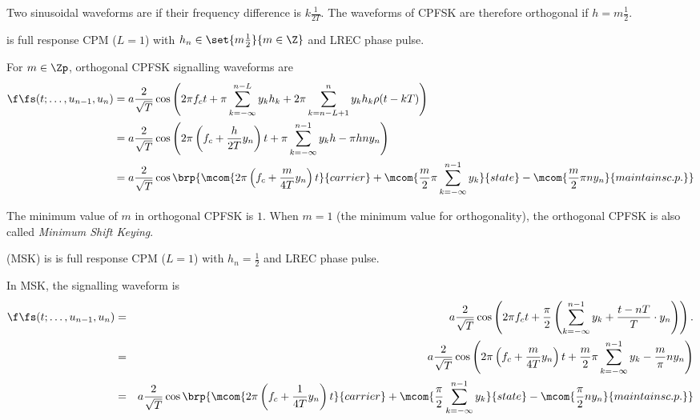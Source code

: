 Two sinusoidal waveforms are  if their frequency difference is 
$k\frac{1}{2T}$. 
The waveforms of CPFSK are therefore orthogonal if $h=m\frac{1}{2}$.
\begin{definition}
is full response CPM ($L=1$) with $h_n\in\set{m\frac{1}{2}}{m\in\Z}$
and LREC phase pulse.
\end{definition}

For $m\in\Zp$, orthogonal CPFSK signalling waveforms are
\begin{align*}
   \f\fs(t;\ldots,u_{n-1},u_n)
     &= a \frac{2}{\sqrt{T}} 
          \cos\left(
             2\pi f_ct + 
             \pi \sum_{k=-\infty}^{n-L} y_k h_k  + 
             2\pi \sum_{k=n-L+1}^n y_k h_k \rho(t-kT)
          \right)
   \\&= a \frac{2}{\sqrt{T}} 
          \cos\left(
             2\pi \left(f_c +  \frac{h}{2T}y_n \right)t 
             + \pi \sum_{k=-\infty}^{n-1} y_k h  
             -\pi hn y_n  
          \right)
   \\&= a \frac{2}{\sqrt{T}} 
          \cos\brp{
            \mcom{2\pi \left(f_c +  \frac{m}{4T}y_n \right)t}{carrier} +
            \mcom{\frac{m}{2}\pi \sum_{k=-\infty}^{n-1} y_k }{state}  -
            \mcom{\frac{m}{2}\pi n y_n }{maintains c.p.}
            }
\end{align*}

The minimum value of $m$ in orthogonal CPFSK is $1$. 
When $m=1$ (the minimum value for orthogonality), 
the orthogonal CPFSK is also called {\em Minimum Shift Keying}.
\begin{definition}
 (MSK) is 
is full response CPM ($L=1$) with $h_n=\frac{1}{2}$
and LREC phase pulse.
\end{definition}

In MSK, the signalling waveform is
\begin{eqnarray*}
   \f\fs(t;\ldots,u_{n-1},u_n)
     &=& a \frac{2}{\sqrt{T}} 
           \cos\left( 
              2\pi f_ct + 
              \frac{\pi}{2} \left( \sum_{k=-\infty}^{n-1} y_k  +
              \frac{t-nT}{T}\cdot y_n \right)
           \right).
   \\&=& a \frac{2}{\sqrt{T}} 
           \cos\left(
              2\pi \left(f_c +  \frac{m}{4T}y_n \right)t 
              + \frac{m}{2}\pi \sum_{k=-\infty}^{n-1} y_k   
              -\frac{m}{\pi} n y_n  
           \right)
   \\&=& a \frac{2}{\sqrt{T}} 
           \cos\brp{
              \mcom{2\pi \left(f_c +  \frac{1}{4T}y_n \right)t}{carrier} +
              \mcom{\frac{\pi}{2} \sum_{k=-\infty}^{n-1} y_k }{state}  -
              \mcom{\frac{\pi}{2} n y_n }{maintains c.p.}
           }
\end{eqnarray*}


